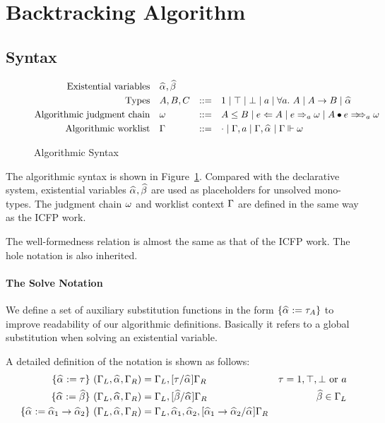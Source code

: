 
\section{Backtracking Algorithm}

\subsection{Syntax}

\begin{figure}[ht]
    \begin{gather*}
    \begin{aligned}
        \text{Existential variables}\quad&\al, \bt\\
        \text{Types}\quad&A, B, C &::=&\quad 1 \mid \top \mid \bot \mid a \mid \all A \mid A\to B \mid \al\\
        \text{Algorithmic judgment chain}\quad&\jg &::=&\quad A \le B \mid e\Lto A \mid e\To_{a} \jg \mid \appInfAlg{A}{e}\\
        \text{Algorithmic worklist}\quad&\Gm &::=&\quad \cdot \mid \Gm, a \mid \Gm, \al \mid \Gm \Vdash \jg
    \end{aligned}
    \end{gather*}
\caption{Algorithmic Syntax}\label{fig:top_alg_syntax}
\end{figure}

The algorithmic syntax is shown in Figure~\ref{fig:top_alg_syntax}.
Compared with the declarative system, existential variables $\al, \bt$ are used
as placeholders for unsolved mono-types.
The judgment chain $\omega$ and worklist context $\Gamma$ are defined in the same way as the ICFP work.

The well-formedness relation is almost the same as that of the ICFP work.
The hole notation is also inherited.

\paragraph{The Solve Notation}
We define a set of auxiliary substitution functions in the form $\{\al := \tau_A\}$
to improve readability of our algorithmic definitions.
Basically it refers to a global substitution when solving an existential variable.

A detailed definition of the notation is shown as follows:
\begin{gather*}
    \begin{aligned}
        \{\al := \tau\}~(\Gm_L, \al, \Gm_R) &= \Gm_L, [\tau/\al]\Gm_R & \tau = 1, \top, \bot \text{ or }a\\
        \{\al := \bt\}~(\Gm_L, \al, \Gm_R) &= \Gm_L, [\bt/\al]\Gm_R & \bt \in \Gm_L\\
        \{\al := \al[1] \to \al[2]\}~(\Gm_L, \al, \Gm_R) &= \Gm_L, \al[1], \al[2], [\al[1] \to \al[2]/\al]\Gm_R\\
    \end{aligned}
\end{gather*}

